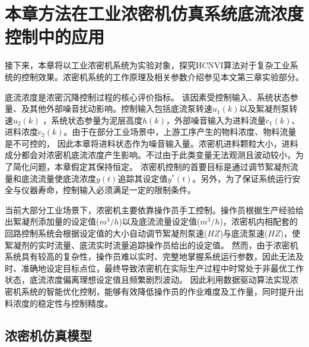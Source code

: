 \section{本章方法在工业浓密机仿真系统底流浓度控制中的应用}
\label{sec:experiment}
接下来，本章将以工业浓密机系统为实验对象，探究HCNVI算法对于复杂工业系统的控制效果。浓密机系统的工作原理及相关参数介绍参见本文第三章实验部分。

底流浓度是浓密沉降控制过程的核心评价指标。
该因素受控制输入、系统状态参量、及其他外部噪音扰动影响。控制输入包括底流泵转速$u_1(k)$以及絮凝剂泵转速$u_2(k)$
，系统状态参量为泥层高度$h(k)$，外部噪音输入为进料流量$c_1(k)$、进料浓度$c_2(k)$。由于在部分工业场景中，上游工序产生的物料浓度、物料流量是不可控的，
因此本章将进料状态作为噪音输入量。浓密机进料颗粒大小，进料成分都会对浓密机底流浓度产生影响。不过由于此类变量无法观测且波动较小，为了简化问题，本章假定其保持恒定。
浓密机控制的首要目标是通过调节絮凝剂流量和底流流量使底流浓度$y(t)$追踪其设定值$y^*(t)$。另外，为了保证系统运行安全与仪器寿命，控制输入必须满足一定的限制条件。

当前大部分工业场景下，浓密机主要依靠操作员手工控制。操作员根据生产经验给出絮凝剂添加量的设定值($m^3/h$)以及底流流量设定值($m^3/h$)，浓密机内相配套的回路控制系统会根据设定值的大小自动调节絮凝剂泵速($HZ$)与底流泵速($HZ$)，使絮凝剂的实时流量、底流实时流量追踪操作员给出的设定值。
然而，由于浓密机系统具有较高的复杂性，操作员难以实时、完整地掌握系统运行参数，因此无法及时、准确地设定目标点位，最终导致浓密机在实际生产过程中时常处于非最优工作状态，底流浓度偏离理想设定值且频繁剧烈波动。
因此利用数据驱动算法实现浓密机系统的智能优化控制，能够有效降低操作员的作业难度及工作量，同时提升出料浓度的稳定性与控制精度。

\subsection{浓密机仿真模型}


